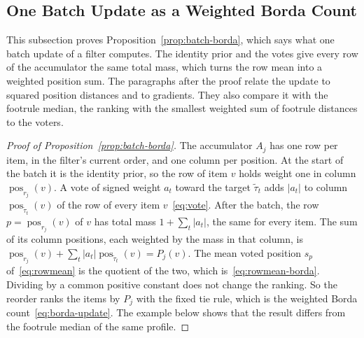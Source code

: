 \subsection{One Batch Update as a Weighted Borda Count}\label{supp:borda}

This subsection proves Proposition~\ref{prop:batch-borda}, which says what one batch update of a filter computes. The identity prior and the votes give every row of the accumulator the same total mass, which turns the row mean into a weighted position sum. The paragraphs after the proof relate the update to squared position distances and to gradients. They also compare it with the footrule median, the ranking with the smallest weighted sum of footrule distances to the voters.

\begin{proof}[Proof of Proposition~\ref{prop:batch-borda}]
The accumulator $A_j$ has one row per item, in the filter's current order, and one column per position. At the start of the batch it is the identity prior, so the row of item $v$ holds weight one in column $\operatorname{pos}_{r_j}(v)$. A vote of signed weight $a_t$ toward the target $\tilde\tau_t$ adds $|a_t|$ to column $\operatorname{pos}_{\tilde\tau_t}(v)$ of the row of every item $v$~\eqref{eq:vote}. After the batch, the row $p=\operatorname{pos}_{r_j}(v)$ of $v$ has total mass $1+\sum_t|a_t|$, the same for every item. The sum of its column positions, each weighted by the mass in that column, is $\operatorname{pos}_{r_j}(v)+\sum_t|a_t|\operatorname{pos}_{\tilde\tau_t}(v)=P_j(v)$. The mean voted position $s_p$ of~\eqref{eq:rowmean} is the quotient of the two, which is~\eqref{eq:rowmean-borda}. Dividing by a common positive constant does not change the ranking. So the reorder ranks the items by $P_j$ with the fixed tie rule, which is the weighted Borda count~\eqref{eq:borda-update}. The example below shows that the result differs from the footrule median of the same profile.
\end{proof}

